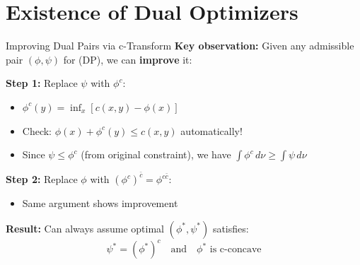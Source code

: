 \documentclass[aspectratio=169]{beamer}
\begin{document}
\section{Existence of Dual Optimizers}

\begin{frame}{Improving Dual Pairs via c-Transform}
\textbf{Key observation:} Given any admissible pair $(\phi, \psi)$ for (DP), we can \textbf{improve} it:

\vspace{0.3cm}
\textbf{Step 1:} Replace $\psi$ with $\phi^c$:
\begin{itemize}
    \item $\phi^c(y) = \inf_x [c(x,y) - \phi(x)]$
    \item Check: $\phi(x) + \phi^c(y) \leq c(x,y)$ automatically! \checkmark
    \item Since $\psi \leq \phi^c$ (from original constraint), we have $\int \phi^c \, d\nu \geq \int \psi \, d\nu$
\end{itemize}

\vspace{0.3cm}
\textbf{Step 2:} Replace $\phi$ with $(\phi^c)^{\bar{c}} = \phi^{c\bar{c}}$:
\begin{itemize}
    \item Same argument shows improvement
\end{itemize}

\vspace{0.3cm}
\textbf{Result:} Can always assume optimal $(\phi^*, \psi^*)$ satisfies:
\[
\psi^* = (\phi^*)^c \quad \text{and} \quad \phi^* \text{ is c-concave}
\]
\end{frame}
\end{document}
